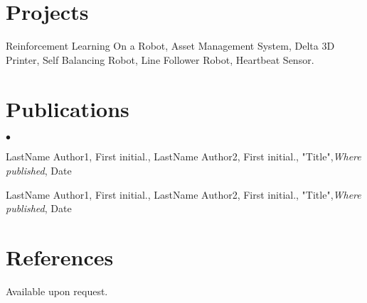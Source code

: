 \documentclass[margin,line]{res}
\newenvironment{list2}{
  \begin{list}{$\bullet$}{%
      \setlength{\itemsep}{0in}
      \setlength{\parsep}{0in} \setlength{\parskip}{0in}
      \setlength{\topsep}{0in} \setlength{\partopsep}{0in}
      \setlength{\leftmargin}{0.2in}}}{\end{list}}
\begin{document}
\begin{resume}
\section{\sc Projects}
 Reinforcement Learning On a Robot,
 Asset Management System, Delta 3D Printer, Self Balancing Robot, Line Follower Robot, Heartbeat Sensor.

\section{\sc Publications}

\begin{list2}
\item LastName Author1, First initial., LastName Author2, First initial.,  "Title",{\em Where published}, Date
\item LastName Author1, First initial., LastName Author2, First initial.,  "Title",{\em Where published}, Date
\end{list2}


\section{\sc References }
Available upon request.

\end{resume}
\end{document}

